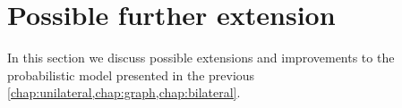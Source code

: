 \documentclass[\relativeRoot/main.tex]{subfiles}
\begin{document}
\chapter{Possible further extension}
\label{chap:extensions}

In this section we discuss possible extensions and improvements to the probabilistic model presented in the previous \cref{chap:unilateral,chap:graph,chap:bilateral}.






\end{document}
